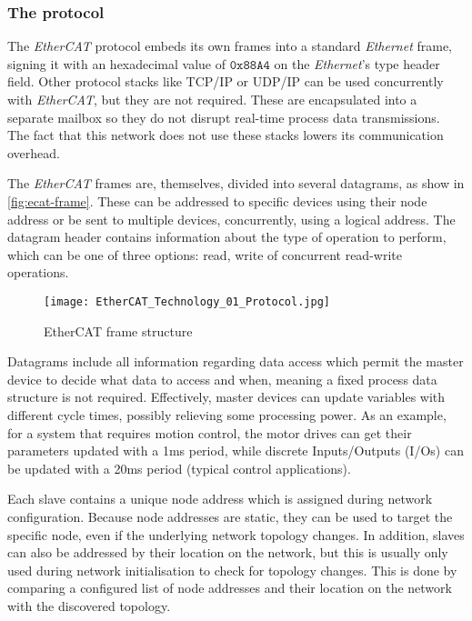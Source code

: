 \subsubsection{The protocol}

The \emph{EtherCAT} protocol embeds its own frames into a standard \emph{Ethernet} frame, signing it with an hexadecimal value of $\mathtt{0x88A4}$ on the \emph{Ethernet}'s type header field.
Other protocol stacks like TCP/IP or UDP/IP can be used concurrently with \emph{EtherCAT}, but they are not required.
These are encapsulated into a separate mailbox so they do not disrupt real-time process data transmissions.
The fact that this network does not use these stacks lowers its communication overhead.

The \emph{EtherCAT} frames are, themselves, divided into several datagrams, as show in \autoref{fig:ecat-frame}.
These can be addressed to specific devices using their node address or be sent to multiple devices, concurrently, using a logical address.
The datagram header contains information about the type of operation to perform, which can be one of three options: read, write of concurrent read-write operations.

\begin{figure}[htp]
	\centering
	\texttt{[image: EtherCAT\_Technology\_01\_Protocol.jpg]}
	\caption{EtherCAT frame structure}
	\label{fig:ecat-frame}
\end{figure}

Datagrams include all information regarding data access which permit the master device to decide what data to access and when, meaning a fixed process data structure is not required.
Effectively, master devices can update variables with different cycle times, possibly relieving some processing power.
As an example, for a system that requires motion control, the motor drives can get their parameters updated with a 1ms period, while discrete Inputs/Outputs (I/Os) can be updated with a 20ms period (typical control applications).

Each slave contains a unique node address which is assigned during network configuration.
Because node addresses are static, they can be used to target the specific node, even if the underlying network topology changes.
In addition, slaves can also be addressed by their location on the network, but this is usually only used during network initialisation to check for topology changes.
This is done by comparing a configured list of node addresses and their location on the network with the discovered topology.

